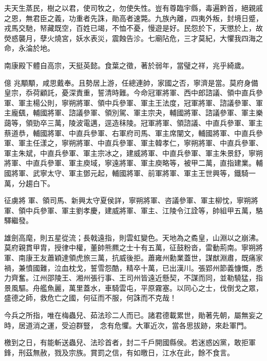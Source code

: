 \begin{pinyinscope}
 夫天生蒸民，樹之以君，使司牧之，勿使失性。豈有尊臨宇縣，毒遍黔首，絕親戚之恩，無君臣之義，功重者先誅，勛高者速斃。九族內離，四夷外叛，封境日蹙，戎馬交馳，帑藏既空，百姓已竭，不恤不憂，慢遊是好。民怨於下，天懲於上，故熒惑襲月，孽火燒宮，妖水表災，震蝕告沴。七廟阽危，三才莫紀，大懼我四海之命，永淪於地。



 南康殿下體自高宗，天挺英懿。食葉之徵，著於弱年，當璧之祥，兆乎綺歲。



 億
 兆顒顒，咸思戴奉。且勢居上游，任總連帥，家國之否，寧濟是當。莫府身備皇宗，忝荷顧託，憂深責重，誓清時難。今命冠軍將軍、西中郎諮議、領中直兵參軍、軍主楊公則，寧朔將軍、領中兵參軍、軍主王法度，冠軍將軍、諮議參軍、軍主龐颻，輔國將軍、諮議參軍、領別駕、軍主宗夬，輔國將軍、諮議參軍、軍主樂藹等，領勁卒三萬，陵波電邁，逕造秣陵。冠軍將軍、領諮議、中直兵參軍、軍主蔡道恭，輔國將軍、中直兵參軍、右軍府司馬、軍主席闡文，輔國將軍、中直兵參軍、軍主任漾之，寧朔將軍、中直兵參軍、軍主韓孝仁，寧朔將軍、中直兵參軍、軍主朱斌，中直兵參軍、軍主宗冰之，建威將軍、中直兵參軍、軍主朱景舒，寧朔將軍、中直兵參軍、軍主庾域，寧遠將軍、軍主庾略等，被甲二萬，直指建業。輔國將軍、武寧太守、軍主鄧元起，輔國將軍、前軍將軍、軍主王世興等，鐵騎一萬，分趨白下。



 征虜將
 軍、領司馬、新興太守夏侯詳，寧朔將軍、咨議參軍、軍主柳忱，寧朔將軍、領中兵參軍、軍主劉孝慶，建威將軍、軍主、江陵令江詮等，帥組甲五萬，駱驛繼發。



 雄劍高麾，則五星從流；長戟遠指，則雲虹變色。天地為之矞皇，山淵以之崩沸。莫府親貫甲胄，授律中權，董帥熊羆之士十有五萬，征鼓粉沓，雷動荊南。寧朔將軍、南康王友蕭穎達領虎旅三萬，抗威後拒。蕭雍州勳業蓋世，謀猷淵肅，既痛家禍，兼憤國難，泣血枕戈，誓雪怨酷，精卒十萬，已出漢川。張郢州節義慷慨，悉力齊奮。江州邵陵王、湘州張行事、王司州皆遠近懸契，不謀而同，並勒驍猛，指景風驅。舟艦魚麗，萬里蓋水，車騎雲屯，平原霧塞。以同心之士，伐倒戈之眾，盛德之師，救危亡之國，何征而不服，何誅而不克哉！



 今兵之所指，唯在梅蟲兒、茹法珍二人而已。諸君德載累世，勛著先朝，屬無妄之時，居道消之運，受迫群豎，
 念有危懼。大軍近次，當各思拔跡，來赴軍門。



 檄到之日，有能斬送蟲兒、法珍首者，封二千戶開國縣侯。若迷惑凶黨，敢拒軍鋒，刑茲無赦，戮及宗族。賞罰之信，有如曒日，江水在此，餘不食言。




\end{pinyinscope}
